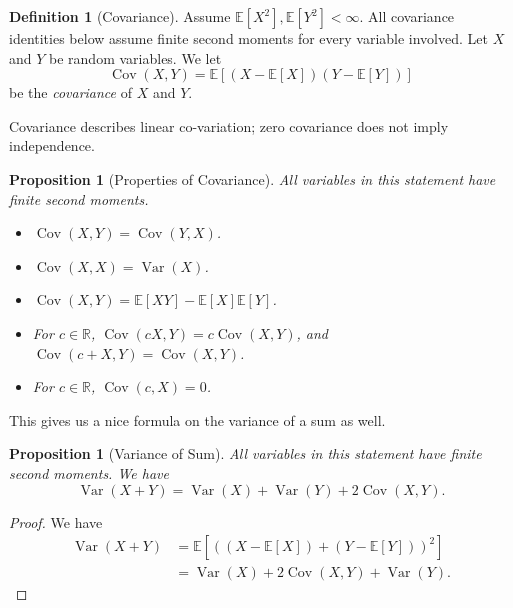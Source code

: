 \documentclass[11pt]{article}
\numberwithin{equation}{section}
\newtheorem{proposition}[theorem]{Proposition}
\theoremstyle{definition}
\newtheorem{definition}[theorem]{Definition}
\theoremstyle{remark}
\newcommand{\pqty}[1]{\left(#1\right)}
\newcommand{\bqty}[1]{\left[#1\right]}
\newcommand{\RR}{\mathbb R}
\newcommand{\Expt}{\mathbb E}
\DeclareMathOperator{\Var}{Var}
\DeclareMathOperator{\Cov}{Cov}
\begin{document}
\begin{definition}[Covariance]\label{probability-definition-029}
    \label{probability-def:covariance}%
Assume \(\Expt[X^2],\Expt[Y^2]<\infty\). All covariance identities below assume finite second moments for every variable involved.
    Let \(X\) and \(Y\) be random variables. We let
    \[
        \Cov\pqty{X, Y} = \Expt\bqty{\pqty{X - \Expt\bqty{X}} \pqty{Y - \Expt\bqty{Y}}}
    \]
    be the \emph{covariance} of \(X\) and \(Y\).
\end{definition}

Covariance describes linear co-variation; zero covariance does not imply independence.

\begin{proposition}[Properties of Covariance]\label{probability-proposition-013}
    \label{probability-prop:properties-of-covariance}
All variables in this statement have finite second moments.
%
    \begin{itemize}
        \item \(\Cov\pqty{X, Y} = \Cov\pqty{Y, X}\). 
        \item \(\Cov\pqty{X, X} = \Var\pqty{X}\).
        \item \(\Cov\pqty{X, Y} = \Expt\bqty{X Y} - \Expt\bqty{X} \Expt\bqty{Y}\).
        \item For \(c \in \RR\), \(\Cov\pqty{cX, Y} = c \Cov\pqty{X, Y}\), and \(\Cov\pqty{c + X, Y} = \Cov\pqty{X, Y}\).
        \item For \(c \in \RR\), \(\Cov\pqty{c, X} = 0\).
    \end{itemize}
\end{proposition}

This gives us a nice formula on the variance of a sum as well.

\begin{proposition}[Variance of Sum]\label{probability-proposition-014}
    \label{probability-prop:variance-of-sum}
All variables in this statement have finite second moments.
%
    We have
    \[
        \Var\pqty{X + Y} = \Var\pqty{X} + \Var\pqty{Y} + 2 \Cov\pqty{X, Y}.
    \]    
\end{proposition}

\begin{proof}\label{probability-proof-023}
    We have
    \begin{align*}
        \Var\pqty{X + Y} &= \Expt\bqty{\pqty{\pqty{X - \Expt\bqty{X}} + \pqty{Y - \Expt\bqty{Y}}}^2} \\
        &= \Var\pqty{X} + 2 \Cov\pqty{X, Y} + \Var\pqty{Y}.
    \end{align*}
\end{proof}
\end{document}
